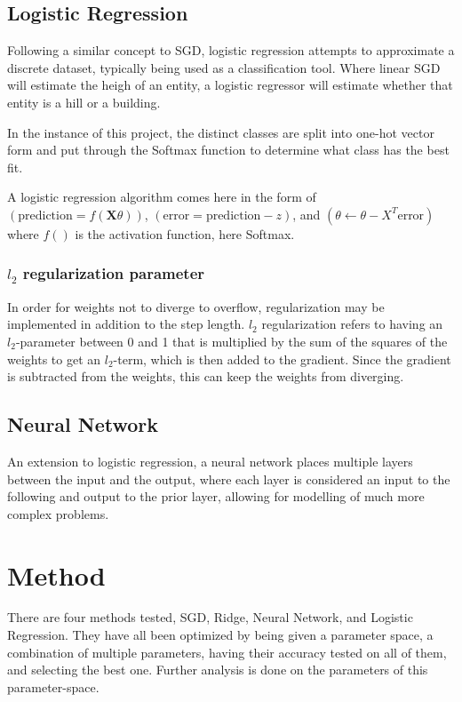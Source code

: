 \documentclass[a4paper, UKenglish]{article}
\newcommand{\0}{\mathbf{0}}
\newcommand{\1}{\mathbf{1}}
\begin{document}
\subsection{Logistic Regression}
Following a similar concept to SGD, logistic regression attempts to approximate a discrete dataset, typically being used as a classification tool. Where linear SGD will estimate the heigh of an entity, a logistic regressor will estimate whether that entity is a hill or a building. 

In the instance of this project, the distinct classes are split into one-hot vector form and put through the Softmax function to determine what class has the best fit.

A logistic regression algorithm comes here in the form of $(\text{prediction} = f(\textbf{X}\theta))$, $(\text{error} = \text{prediction} - z)$, and $(\theta \leftarrow \theta - X^T \text{error}) $ where $f()$ is the activation function, here Softmax.


\subsubsection{$l_2$ regularization parameter}
In order for weights not to diverge to overflow, regularization may be implemented in addition to the step length. $l_2$ regularization refers to having an $l_2$-parameter between 0 and 1 that is multiplied by the sum of the squares of the weights to get an $l_2$-term, which is then added to the gradient. Since the gradient is subtracted from the weights, this can keep the weights from diverging.


\subsection{Neural Network}
An extension to logistic regression, a neural network places multiple layers between the input and the output, where each layer is considered an input to the following and output to the prior layer, allowing for modelling of much more complex problems.

\section{Method}
There are four methods tested, SGD, Ridge, Neural Network, and Logistic Regression. They have all been optimized by being given a parameter space, a combination of multiple parameters, having their accuracy tested on all of them, and selecting the best one. Further analysis is done on the parameters of this parameter-space.
\end{document}
